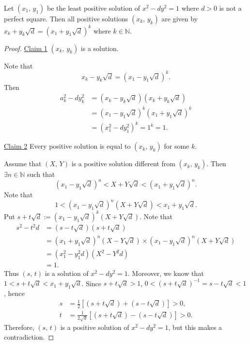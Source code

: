 \begin{theorem}
    Let $\left(x_1,\,y_1\right)$ be the least positive solution of $x^2-dy^2=1$
    where $d>0$ is not a perfect square. Then all positive solutions $\left(x_k,\,y_k\right)$
    are given by $x_k+y_k \sqrt{d} = \left( x_1+y_1\sqrt{d} \right)^k$ where $k \in \mathbb{N}$.
\end{theorem}
\begin{proof}
    \underline{Claim 1} $\left(x_k,\,y_k\right)$ is a solution.

    Note that
    \[x_k - y_k\sqrt{d} = \left(x_1-y_1 \sqrt{d}\right)^k.\]
    Then
    \begin{align*}
        a_k^2-dy_k^2 &= \left(x_k-y_k\sqrt{d}\right)\left(x_k+y_k\sqrt{d}\right) \\
        &= \left(x_1-y_1\sqrt{d}\right)^k\left(x_1+y_1\sqrt{d}\right)^k \\
        &= \left(x_1^2 - dy_1^2\right)^k = 1^k = 1.
    \end{align*}

    \underline{Claim 2} Every positive solution is equal to $\left(x_k,\,y_k\right)$
    for some $k$.

    Assume that $\left(X,\,Y\right)$ is a positive solution different from
    $\left( x_k,\,y_k \right)$. Then $\exists n \in \mathbb{N}$ such that
    \[\left(x_1-y_1\sqrt{d}\right)^n < X+Y\sqrt{d} < \left(x_1+y_1\sqrt{d}\right)^n.\]
    Note that 
    \[1<\left(x_1-y_1\sqrt{d}\right)^n\left(X+Y\sqrt{d}\right)<x_1+y_1\sqrt{d}.\]
    Put $s+t\sqrt{d} := \left(x_1-y_1\sqrt{d}\right)^k\left(X+Y\sqrt{d}\right)$.
    Note that
    \begin{align*}
        s^2-t^2d &= \left(s-t\sqrt{d}\right)\left(s+t\sqrt{d}\right) \\
        &= \left(x_1+y_1\sqrt{d}\right)^n\left(X-Y\sqrt{d}\right)\times \left(x_1-y_1\sqrt{d}\right)^n\left(X+Y\sqrt{d}\right) \\
        &= \left(x_1^2-y_1^2d\right)\left(X^2-Y^2d\right) \\
        &= 1.
    \end{align*}
    Thus $\left(s,\,t\right)$ is a solution of $x^2-dy^2=1$. Moreover, we know that
    $1<s+t\sqrt{d}<x_1+y_1\sqrt{d}$. Since $s+t\sqrt{d}>1$, $0<\left(s+t\sqrt{d}\right)^{-1}=s-t\sqrt{d}<1$,
    hence
    \begin{align*}
        s&=\frac{1}{2}\left[\left(s+t\sqrt{d}\right)+\left(s-t\sqrt{d}\right)\right]>0,\\
        t&=\frac{1}{2\sqrt{d}}\left[\left(s+t\sqrt{d}\right)-\left(s-t\sqrt{d}\right)\right]>0.
    \end{align*}
    Therefore, $\left(s,\,t\right)$ is a positive solution of $x^2-dy^2=1$, but this makes a contradiction.
\end{proof}